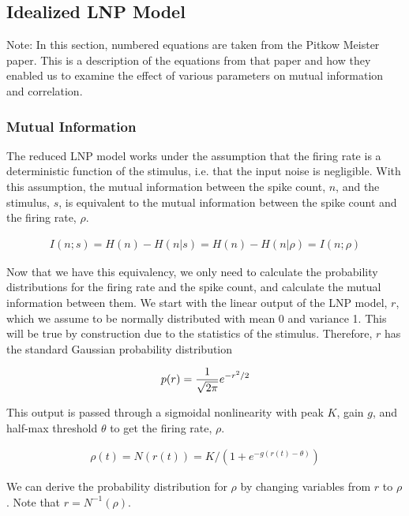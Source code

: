\documentclass[12pt]{article}
\begin{document}
\subsection{Idealized LNP Model}

Note: In this section, numbered equations are taken from the Pitkow Meister paper. This is a description of the equations from that paper and how they enabled us to examine the effect of various parameters on mutual information and correlation.

\subsubsection{Mutual Information}

The reduced LNP model works under the assumption that the firing rate is a deterministic function of the stimulus, i.e. that the input noise is negligible. With this assumption, the mutual information between the spike count, $n$, and the stimulus, $s$, is equivalent to the mutual information between the spike count and the firing rate, $\rho$.

\begin{align}
\displaystyle I(n;s) = H(n)-H(n|s)=H(n)-H(n|\rho)=I(n;\rho) \tag{18}
\end{align}

\noindent Now that we have this equivalency, we only need to calculate the probability distributions for the firing rate and the spike count, and calculate the mutual information between them. We start with the linear output of the LNP model, $r$, which we assume to be normally distributed with mean 0 and variance 1. This will be true by construction due to the statistics of the stimulus. Therefore, $r$ has the standard Gaussian probability distribution

\begin{align}
\displaystyle p(r) = \frac{1}{\sqrt{2\pi}}e^{-r^2/2} \notag
\end{align}

\noindent This output is passed through a sigmoidal nonlinearity with peak $K$, gain $g$, and half-max threshold $\theta$ to get the firing rate, $\rho$.

\begin{align}
\displaystyle \rho(t) = N(r(t)) = K \Big/ \left(1+e^{-g(r(t)-\theta)}\right) \tag{8, 10}
\end{align}

\noindent We can derive the probability distribution for $\rho$ by changing variables from $r$ to $\rho$. Note that $r=N^{-1}(\rho)$.
\end{document}
